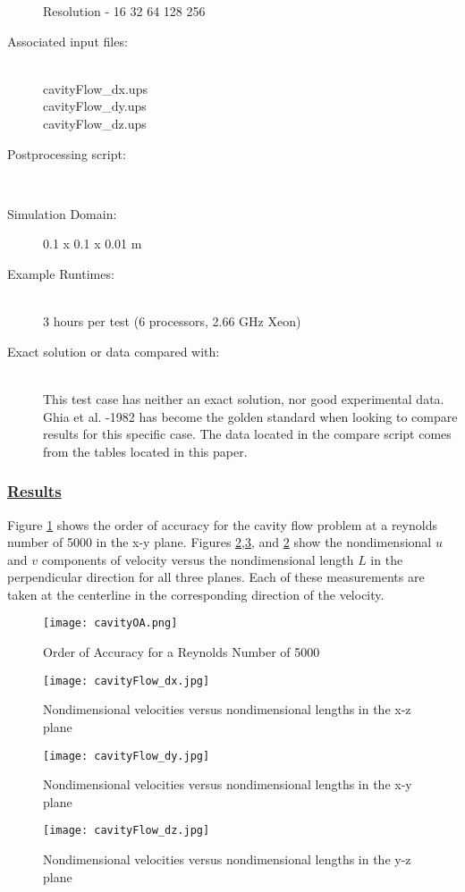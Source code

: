 \begin{description}
\begin{minipage}[t]{0.3\textwidth}
Resolution - 16 32 64 128 256
\end{minipage}
%
\item [Associated input files:]\hfill \\
cavityFlow\_dx.ups \\
cavityFlow\_dy.ups \\
cavityFlow\_dz.ups
%
\item [Postprocessing script:]\hfill \\
%
\item [Simulation Domain:]\hfill    0.1 x 0.1 x 0.01 m
%
\item [Example Runtimes:] \hfill \\
 3 hours per test (6 processors, 2.66 GHz Xeon)
%
\item [Exact solution or data compared with:] \hfill \\
This test case has neither an exact solution, nor good experimental data. Ghia et al. -1982\cite{ref:Ghia} has become the golden standard when looking to compare results for this specific case. The data located in the compare script comes from the tables located in this paper.
% 
\end{description}

\subsubsection*{\underline{Results}}
Figure \ref{fig:cavityOA} shows the order of accuracy for the cavity flow problem at a reynolds number of 5000 in the x-y plane. Figures \ref{fig:cavityFlowx},\ref{fig:cavityFlowy}, and \ref{fig:cavityFlowx} show the nondimensional $u$ and $v$ components of velocity versus the nondimensional length $L$ in the perpendicular direction for all three planes. Each of these measurements are taken at the centerline in the corresponding direction of the velocity.
%  
\begin{figure}[h]
  \centering
  \texttt{[image: cavityOA.png]}
  \caption{Order of Accuracy for a Reynolds Number of 5000}
  \label{fig:cavityOA}
\end{figure}
%
\begin{figure}[h]
  \centering
  \texttt{[image: cavityFlow\_dx.jpg]}
  \caption{Nondimensional velocities versus nondimensional lengths in the x-z plane}
  \label{fig:cavityFlowx}
\end{figure}
%
\begin{figure}[h]
  \centering
  \texttt{[image: cavityFlow\_dy.jpg]}
  \caption{Nondimensional velocities versus nondimensional lengths in the x-y plane}
  \label{fig:cavityFlowy}
\end{figure}
%
\begin{figure}[h]
  \centering
  \texttt{[image: cavityFlow\_dz.jpg]}
  \caption{Nondimensional velocities versus nondimensional lengths in the y-z plane}
  \label{fig:cavityFlowz}
\end{figure}
\newpage






